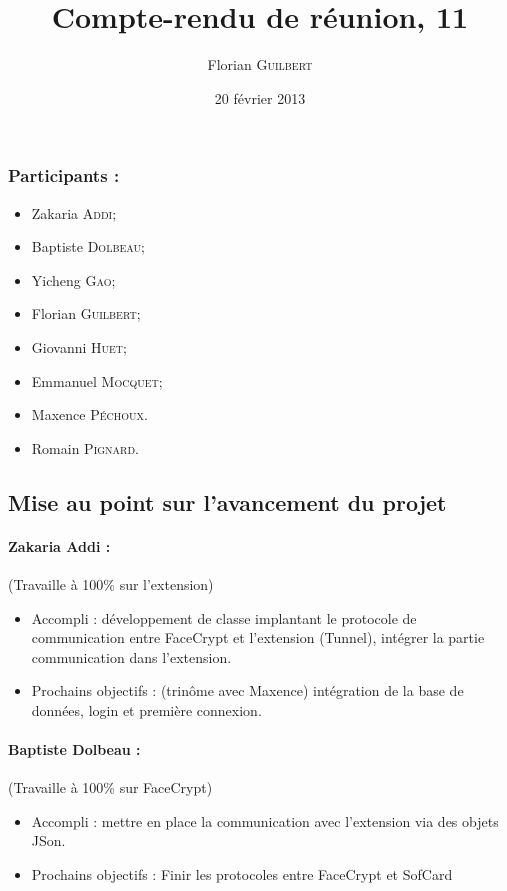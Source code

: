 \documentclass[a4paper,10pt]{article}
\author{Florian \textsc{Guilbert}}
\title{Compte-rendu de réunion, 11}
\date{20 février 2013}
\begin{document}
\maketitle

\subsubsection*{Participants : }
\begin{itemize}
    \item Zakaria \textsc{Addi};
    \item Baptiste \textsc{Dolbeau};
    \item Yicheng \textsc{Gao};
    \item Florian \textsc{Guilbert};
    \item Giovanni \textsc{Huet};
    \item Emmanuel \textsc{Mocquet};
    \item Maxence  \textsc{Péchoux}.
    \item Romain \textsc{Pignard}.
\end{itemize}

\subsection*{Mise au point sur l'avancement du projet}

\paragraph{Zakaria Addi :} (Travaille à 100\% sur l'extension)\\
\begin{itemize}
    \item Accompli : développement de classe implantant le protocole
        de communication entre FaceCrypt et l'extension (Tunnel), intégrer la
        partie communication dans l'extension.
    \item Prochains objectifs : (trinôme avec Maxence) intégration de la 
    base de données, login et première connexion.
\end{itemize}

\paragraph{Baptiste Dolbeau :} (Travaille à 100\% sur FaceCrypt)
\begin{itemize}
\item Accompli : mettre en place la communication avec l'extension via des 
    objets JSon. 
\item Prochains objectifs : Finir les protocoles entre FaceCrypt et SofCard
\end{itemize}
\end{document}
